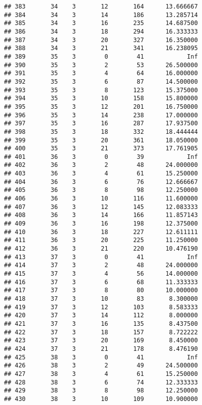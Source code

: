 \documentclass[
]{article}
\begin{document}
\begin{verbatim}
## 383       34    3       12       164      13.666667
## 384       34    3       14       186      13.285714
## 385       34    3       16       235      14.687500
## 386       34    3       18       294      16.333333
## 387       34    3       20       327      16.350000
## 388       34    3       21       341      16.238095
## 389       35    3        0        41            Inf
## 390       35    3        2        53      26.500000
## 391       35    3        4        64      16.000000
## 392       35    3        6        87      14.500000
## 393       35    3        8       123      15.375000
## 394       35    3       10       158      15.800000
## 395       35    3       12       201      16.750000
## 396       35    3       14       238      17.000000
## 397       35    3       16       287      17.937500
## 398       35    3       18       332      18.444444
## 399       35    3       20       361      18.050000
## 400       35    3       21       373      17.761905
## 401       36    3        0        39            Inf
## 402       36    3        2        48      24.000000
## 403       36    3        4        61      15.250000
## 404       36    3        6        76      12.666667
## 405       36    3        8        98      12.250000
## 406       36    3       10       116      11.600000
## 407       36    3       12       145      12.083333
## 408       36    3       14       166      11.857143
## 409       36    3       16       198      12.375000
## 410       36    3       18       227      12.611111
## 411       36    3       20       225      11.250000
## 412       36    3       21       220      10.476190
## 413       37    3        0        41            Inf
## 414       37    3        2        48      24.000000
## 415       37    3        4        56      14.000000
## 416       37    3        6        68      11.333333
## 417       37    3        8        80      10.000000
## 418       37    3       10        83       8.300000
## 419       37    3       12       103       8.583333
## 420       37    3       14       112       8.000000
## 421       37    3       16       135       8.437500
## 422       37    3       18       157       8.722222
## 423       37    3       20       169       8.450000
## 424       37    3       21       178       8.476190
## 425       38    3        0        41            Inf
## 426       38    3        2        49      24.500000
## 427       38    3        4        61      15.250000
## 428       38    3        6        74      12.333333
## 429       38    3        8        98      12.250000
## 430       38    3       10       109      10.900000

\end{verbatim}
\end{document}
